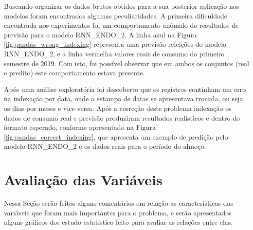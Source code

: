     Buscando organizar os dados brutos obtidos para a sua posterior aplicação nos modelos foram encontrados algumas peculiaridades. A primeira dificuldade encontrada nos experimentos foi um comportamento anômalo do resultados de previsão para o modelo RNN\_ENDO\_2. A linha azul na Figura \ref{fig:pandas_wrong_indexing} representa uma previsão refeições do modelo RNN\_ENDO\_2, e a linha vermelha valores reais de consumo do primeiro semestre de 2019. Com isto, foi possível observar que em ambos os conjuntos (real e predito) este comportamento estava presente. 
    
    \begin{figure}[!htpb]
    \end{figure}
    
    Após uma análise exploratória foi descoberto que os registros continham um erro na indexação por data, onde a estampa de datas se apresentava trocada, ou seja os dias por meses e vice-versa. Após a correção deste problema indexação os dados de consumo real e previsão produziram resultados realísticos e dentro do formato esperado, conforme apresentado na Figura \ref{fig:pandas_correct_indexing}, que apresenta um exemplo de predição pelo modelo RNN\_ENDO\_2 e os dados reais para o período do almoço.
    \begin{figure}[!htpb]
    \end{figure}
              
\section{Avaliação das Variáveis}
Nessa Seção serão feitos alguns comentários em relação as características das variáveis que foram mais importantes para o problema, e serão apresentados alguns gráficos dos estudo estatístico feito para avaliar as relações entre elas. 

